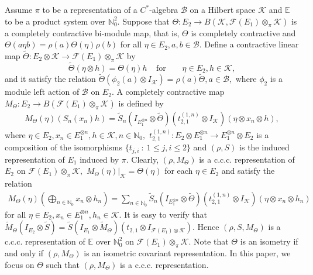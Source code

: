 \documentclass[12pt]{amsart}
\numberwithin{equation}{section}
\theoremstyle{plain}
\newcommand{\ot}{\otimes}
\begin{document}
	
	Assume $\pi $ to be a representation of a $C^*$-algebra $\mathcal{B}$ on a Hilbert space $\mathcal{K}$ and $\mathbb{E}$ to be a product system over $\mathbb{N}_0^2.$ Suppose that $\Theta: E_2 \to B(\mathcal{K}, \mathcal{F}(E_1) \otimes_{\pi} \mathcal{K})$ is a completely contractive  bi-module map, that is, $\Theta$ is  completely contractive  and $\Theta(a \eta b)=\rho(a)\Theta(\eta)\rho(b)$ for all $\eta \in E_2, a,b \in \mathcal{B}.$ Define a contractive linear  map $\widetilde{\Theta}: E_2 \otimes \mathcal{K} \to \mathcal{F}(E_1) \otimes_{\pi} \mathcal{K}$ by $$\widetilde{\Theta}(\eta \otimes h)=\Theta(\eta)h ~~\:\:\: \mbox{for}~~~~~~\:\:\: \eta\in E_2,h\in \mathcal{K},$$ and it satisfy the relation $\widetilde{\Theta}(\phi_2(a) \ot I_{ \mathcal{K}})=\rho(a)\widetilde{\Theta},a\in \mathcal{B},$ where $\phi_2$ is a module left action of $\mathcal{B}$ on $E_2.$ A completely contractive map $M_{\Theta} :E_2  \to B(\mathcal{F}(E_1) \otimes_{\pi} \mathcal{K})$ \cite{STV22} is defined by
\begin{align*}
	M_{\Theta}(\eta) (S_n(x_n) h)=\widetilde{S}_n(I_{E_1^{\otimes n}} \otimes \widetilde{\Theta})(t_{2,1}^{(1,n)} \otimes I_{\mathcal{K}})(\eta \otimes x_n \otimes h),
\end{align*}
	where  $\eta \in E_2, x_n \in E_1^{\otimes n}, h\in \mathcal{K}, n \in \mathbb{N}_0,$ $t_{2,1}^{(1,n)}: E_2 \ot E_1^{\ot n}  \rightarrow E_1^{\ot n} \ot E_2 $ is a composition of the isomorphisms $\{t_{j,i}\: :\: 1 \leq j, i \leq 2\}$ and $(\rho, S)$ is the induced representation of $E_1$ induced by $\pi.$ Clearly, $(\rho,{M}_{\Theta})$ is a c.c.c. representation of $E_2$ on $\mathcal{F}(E_1) \otimes_{\pi} \mathcal{K},$ $M_{\Theta}(\eta)|_{\mathcal{K}}=\Theta(\eta)$ for each $\eta \in E_2$ and satisfy the relation
	\begin{align*}
		M_{\Theta}(\eta)\left(\bigoplus_{n \in \mathbb{N}_0}x_n \otimes h_n\right)=\sum_{n \in \mathbb{N}_0}\widetilde{S}_n(I_{E_1^{\otimes n}} \otimes \widetilde{\Theta})(t_{2,1}^{(1,n)} \otimes I_{\mathcal{K}})(\eta \otimes x_n \otimes h_n)
	\end{align*} 
	for all $\eta \in E_2, x_n \in E_1^{\otimes n}, h_n \in \mathcal{K}.$  It is easy to verify that
	$\widetilde{M}_{\Theta} (I_{E_2} \otimes \widetilde{S})=\widetilde{S} (I_{{E}_1} \otimes \widetilde{M}_{\Theta})(t_{2,1} \otimes I_{\mathcal{F}(E_1) \otimes \mathcal{K}}).$ Hence $(\rho, S, M_{\Theta})$ is a c.c.c. representation of $\mathbb{E}$ over $\mathbb{N}_0^2$ on $\mathcal{F}(E_1) \otimes _{\pi} \mathcal{K}.$ Note that $\Theta$ is an isometry if and only if $(\rho, M_\Theta)$ is an isometric covariant representation. In this paper, we focus on $\Theta$ such that $(\rho, M_\Theta)$ is a c.c.c. representation. 
	
\end{document}
